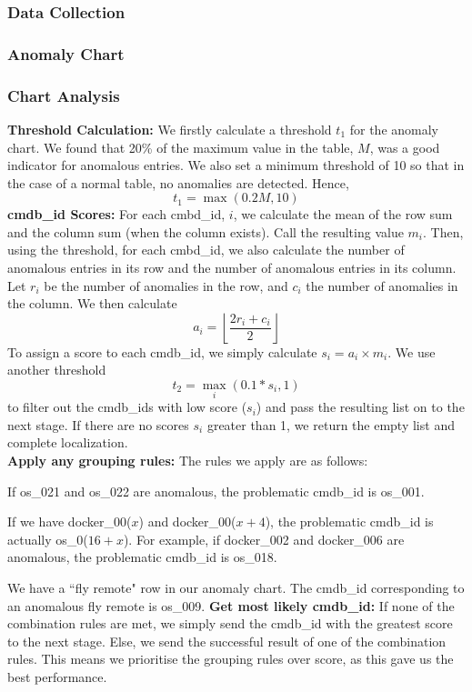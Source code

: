 \documentclass[12pt]{article}
\let\tempone\itemize
\let\temptwo\enditemize
\renewenvironment{itemize}{\tempone\setlength{\itemsep}{0pt}}{\temptwo}
\begin{document}
\subsubsection{Data Collection}

\subsubsection{Anomaly Chart}

\subsubsection{Chart Analysis}
\textbf{Threshold Calculation:} We firstly calculate a threshold $t_1$ for the anomaly chart. We found that 20\% of the maximum value in the table, $M$, was a good indicator for anomalous entries. We also set a minimum threshold of 10 so that in the case of a normal table, no anomalies are detected. Hence,
\[
    t_1 = \max(0.2M, 10)
\]
\textbf{cmdb\_id Scores:} For each cmbd\_id, $i$, we calculate the mean of the row sum and the column sum (when the column exists). Call the resulting value $m_i$. Then, using the threshold, for each cmbd\_id, we also calculate the number of anomalous entries in its row and the number of anomalous entries in its column. Let $r_i$ be the number of anomalies in the row, and $c_i$ the number of anomalies in the column. We then calculate 
\[
    a_i = \left\lfloor\frac{2r_i + c_i}{2}\right\rfloor
\]
To assign a score to each cmdb\_id, we simply calculate $s_i = a_i\times m_i$. We use another threshold
\[
    t_2=\max_{i}(0.1*s_i,1)
\]
to filter out the cmdb\_ids with low score ($s_i$) and pass the resulting list on to the next stage. If there are no scores $s_i$ greater than 1, we return the empty list and complete localization.\\
\textbf{Apply any grouping rules:} The rules we apply are as follows:
\begin{itemize}
    \item If os\_021 and os\_022 are anomalous, the problematic cmdb\_id is os\_001.
    \item If we have docker\_00($x$) and docker\_00($x+4$), the problematic cmdb\_id is actually os\_0($16+x$). For example, if docker\_002 and docker\_006 are anomalous, the problematic cmdb\_id is os\_018.
    \item We have a ``fly remote" row in our anomaly chart. The cmdb\_id corresponding to an anomalous fly remote is os\_009.
\end{itemize}
\textbf{Get most likely cmdb\_id:} If none of the combination rules are met, we simply send the cmdb\_id with the greatest score to the next stage. Else, we send the successful result of one of the combination rules. This means we prioritise the grouping rules over score, as this gave us the best performance.
\end{document}
